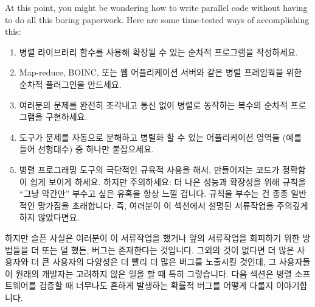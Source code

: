 At this point, you might be wondering how to write parallel code without
having to do all this boring paperwork.
Here are some time-tested ways of accomplishing this:

\fi

\begin{enumerate}
\item	병렬 라이브러리 함수를 사용해 확장될 수 있는 순차적 프로그램을
	작성하세요.
\item	Map-reduce, BOINC, 또는 웹 어플리케이션 서버와 같은 병렬 프레임웍을
	위한 순차적 플러그인을 만드세요.
\item	여러분의 문제를 완전히 조각내고 통신 없이 병렬로 동작하는 복수의 순차적
	프로그램을 구현하세요.
\item	도구가 문제를 자동으로 분해하고 병렬화 할 수 있는 어플리케이션 영역들
	(예를 들어 선형대수) 중 하나만 붙잡으세요.
\item	병렬 프로그래밍 도구의 극단적인 규육적 사용을 해서, 만들어지는 코드가
	정확함이 쉽게 보이게 하세요.
	하지만 주의하세요: 더 나은 성능과 확장성을 위해 규칙을 ``그냥 약간만''
	부수고 싶은 유혹을 항상 느낄 겁니다.
	규칙을 부수는 건 종종 일반적인 망가짐을 초래합니다.
	즉, 여러분이 이 섹션에서 설명된 서류작업을 주의깊게 하지 않았다면요.

\end{enumerate}

하지만 슬픈 사실은 여러분이 이 서류작업을 했거나 앞의 서류작업을 회피하기 위한
방법들을 더 또는 덜 했든, 버그는 존재한다는 것입니다.
그외의 것이 없다면 더 많은 사용자와 더 큰 사용자의 다양성은 더 빨리 더 많은
버그를 노출시킬 것인데, 그 사용자들이 원래의 개발자는 고려하지 않은 일을 할 때
특히 그렇습니다.
다음 섹션은 병렬 소프트웨어를 검증할 때 너무나도 흔하게 발생하는 확률적 버그를
어떻게 다룰지 이야기합니다.


